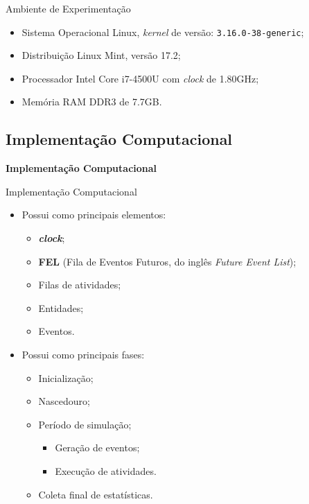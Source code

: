 \documentclass[xcolor=dvipsnames]{beamer}
\let\olditem=\item%
\renewcommand{\item}{\olditem \justifying}%
\begin{document}
\begin{frame}{Ambiente de Experimentação}
	\begin{itemize}
		\item Sistema Operacional Linux, \textit{kernel} de versão: {\tt 3.16.0-38-generic};
        \bigskip
		\item Distribuição Linux Mint, versão 17.2;
        \bigskip
		\item Processador Intel Core i7-4500U com \textit{clock} de 1.80GHz;
        \bigskip
		\item Memória RAM DDR3 de 7.7GB.
	\end{itemize}
\end{frame}
	
\subsection{Implementação Computacional}
		
\begin{frame}{}
	\centering
	\Huge \color{blue} \textbf{Implementação Computacional}
\end{frame}
	
\begin{frame}{Implementação Computacional}
\fontsize{10pt}{7.2}\selectfont
	\begin{itemize}
		\item Possui como principais elementos:
        \medskip
		      \begin{itemize}
		      	\item \textit{\textbf{clock}};
                \medskip
		      	\item \textbf{FEL} (Fila de Eventos Futuros, do inglês \textit{Future Event List});
                \medskip
		      	\item Filas de atividades;
                \medskip
		      	\item Entidades;
                \medskip
		      	\item Eventos.
		      \end{itemize}
		      \bigskip
		\item Possui como principais fases:
        \medskip
		      \begin{itemize}
		      	\item Inicialização;
		      	      \medskip
		      	\item Nascedouro;
		      	      \medskip
		      	\item Período de simulação;
		      	      \begin{itemize}
		      	      	\item Geração de eventos;
		      	      	      \medskip
		      	      	\item Execução de atividades.
		      	      \end{itemize}
		      	      \medskip
		      	\item Coleta final de estatísticas.
		      \end{itemize}
	\end{itemize}
\end{frame}
	
\end{document}

